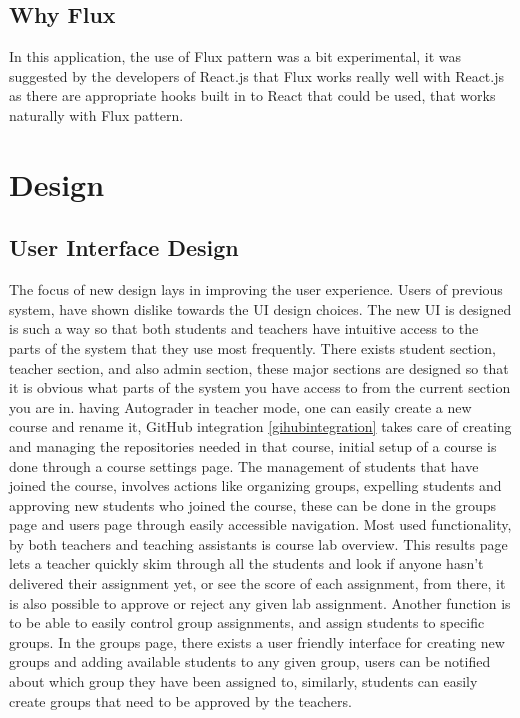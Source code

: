 \subsection{Why Flux}
In this application, the use of Flux pattern was a bit experimental, it was suggested by the developers of React.js that Flux works really well with React.js as there are appropriate hooks built in to React that could be used, that works naturally with Flux pattern. 

\section{Design}

\subsection{User Interface Design}
The focus of new design lays in improving the user experience. Users of previous system, have shown dislike towards the UI design choices. The new UI is designed is such a way so that both students and teachers have intuitive access to the parts of the system that they use most frequently. There exists student section, teacher section, and also admin section, these major sections are designed so that it is obvious what parts of the system you have access to from the current section you are in. having Autograder in teacher mode, one can easily create a new course and rename it, GitHub integration \ref{gihubintegration} takes care of creating and managing the repositories needed in that course, initial setup of a course is done through a course settings page. The management of students that have joined the course, involves actions like organizing groups, expelling students and approving new students who joined the course, these can be done in the groups page and users page through easily accessible navigation. Most used functionality, by both teachers and teaching assistants is course lab overview. This results page lets a teacher quickly skim through all the students and look if anyone hasn't delivered their assignment yet, or see the score of each assignment, from there, it is also possible to approve or reject any given lab assignment. Another function is to be able to easily control group assignments, and assign students to specific groups. In the groups page, there exists a user friendly interface for creating new groups and adding available students to any given group, users can be notified about which group they have been assigned to, similarly, students can easily create groups that need to be approved by the teachers.

